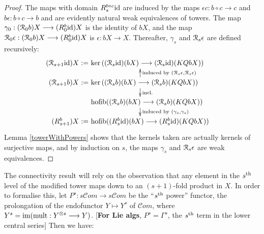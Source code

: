 \documentclass[11pt]{amsart}
\theoremstyle{plain}
\theoremstyle{definition}
\renewcommand{\ker}{\textup{ker}\,}
\DeclareMathOperator*{\hofib}{hofib}
\renewcommand{\to}{\longrightarrow}
\newcommand{\scrC}{\mathscr{C}}
\newcommand{\calR}{\mathcal{R}}
\theoremstyle{plain}
\newcommand{\Id}{\textup{id}}
\newcommand{\algcat}{{\scrC\!\textit{om}}}%
\newcommand{\caldup}[1]{\calR_{\smash{#1}}}
\newcommand{\plainD}{R}
\newcommand{\barConstructionMightAbbreviate}{b}
\begin{document}
\begin{Bousfield-Kan spectral sequence}
\begin{proof}
The maps with domain $\plainD_{\smash{s}}^{\smash{\barConstructionMightAbbreviate \circ c}}\Id $ are induced by the maps $\epsilon c:\barConstructionMightAbbreviate \circ c\to c$ and $\barConstructionMightAbbreviate \epsilon:\barConstructionMightAbbreviate \circ c\to \barConstructionMightAbbreviate $ and are evidently natural weak equivalences of towers. The map $\gamma_0:(\caldup{0}\barConstructionMightAbbreviate )X\to (\plainD_{\smash{0}}^{\smash{\barConstructionMightAbbreviate }}\Id )X$ is the identity of $\barConstructionMightAbbreviate X$, and the map $\caldup{0}\epsilon:(\caldup{0}\barConstructionMightAbbreviate )X\to (\plainD_{\smash{0}}^{\smash{\barConstructionMightAbbreviate }}\Id )X$ is $\epsilon:\barConstructionMightAbbreviate X\to X$. Thereafter, $\gamma_s$ and $\caldup{s}\epsilon$ are defined recursively:
\[\qquad \quad \xymatrix@R=4mm{
\makebox[0cm][r]{$(\caldup{s+1}\Id )X:=\,$}\makebox[5cm][l]{$\,\ker((\caldup{s}\Id )(\barConstructionMightAbbreviate X)\to (\caldup{s}\Id )(KQ\barConstructionMightAbbreviate X))$}\\
\makebox[0cm][r]{$(\caldup{s+1}\barConstructionMightAbbreviate )X:=\,$}\makebox[5cm][l]{$\,\ker((\caldup{s}\barConstructionMightAbbreviate )(\barConstructionMightAbbreviate X)\to (\caldup{s}\barConstructionMightAbbreviate )(KQ\barConstructionMightAbbreviate X))$}\ar[d]^-{\textup{incl.}}_-{}%
\ar[u]_-{\textup{induced by }(\caldup{s}\epsilon,\caldup{s}\epsilon)}^-{}%
\\%
\makebox[5cm][l]{$\,\hofib((\caldup{s}\barConstructionMightAbbreviate )(\barConstructionMightAbbreviate X)\to(\caldup{s}\barConstructionMightAbbreviate )(KQ\barConstructionMightAbbreviate X))$}\ar[d]^-{\textup{induced by }(\gamma_{s},\gamma_{s})}_-{}%
\\%
\makebox[0cm][r]{$(\plainD_{\smash{s+1}}^{\smash{\barConstructionMightAbbreviate }})X:=\,$}\makebox[5cm][l]{$\,\hofib((\plainD_{\smash{s}}^{\smash{\barConstructionMightAbbreviate }}\Id )(\barConstructionMightAbbreviate X)\to (\plainD_{\smash{s}}^{\smash{\barConstructionMightAbbreviate }}\Id )(KQ\barConstructionMightAbbreviate X))$}%
}\]
\noindent Lemma \ref{towerWithPowers} shows that the kernels taken are actually kernels of surjective maps, and by induction on $s$, the maps $\gamma_s$ and $\caldup{s}\epsilon$ are weak equivalences.
\end{proof}
The connectivity result will rely on the observation that any element in the $s^\textup{th}$ level of the modified tower maps down to an $(s+1)$-fold product in $X$. In order to formalise this, let $P^s:s\algcat\to s\algcat$ be the ``$s^\textup{th}$ power'' functor, the prolongation of the endofunctor $Y\mapsto Y^s$ of $\algcat$, where $Y^s=\textup{im}(\textup{mult}:Y^{\otimes s}\to Y)$. [\textbf{For Lie algs}, $P^s=\Gamma^s$, the $s^\textup{th}$ term in the lower central series] Then we have:

\end{Bousfield-Kan spectral sequence}
\end{document}
